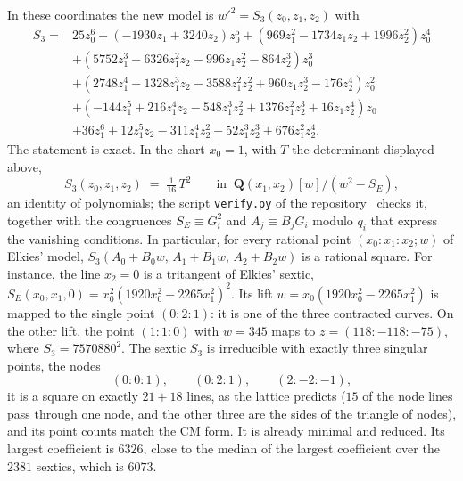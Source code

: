 \documentclass[11pt]{article}
\newcommand{\Q}{\mathbf{Q}}
\theoremstyle{remark}
\begin{document}
In these coordinates the new model is $w'^2=S_{3}(z_0,z_1,z_2)$ with
\begin{align*}
S_{3}={}&25z_0^6+(-1930z_1+3240z_2)z_0^5+(969z_1^2-1734z_1z_2+1996z_2^2)z_0^4\\
&+(5752z_1^3-6326z_1^2z_2-996z_1z_2^2-864z_2^3)z_0^3\\
&+(2748z_1^4-1328z_1^3z_2-3588z_1^2z_2^2+960z_1z_2^3-176z_2^4)z_0^2\\
&+(-144z_1^5+216z_1^4z_2-548z_1^3z_2^2+1376z_1^2z_2^3+16z_1z_2^4)z_0\\
&+36z_1^6+12z_1^5z_2-311z_1^4z_2^2-52z_1^3z_2^3+676z_1^2z_2^4 .
\end{align*}
The statement is exact.  In the chart $x_0=1$, with $T$ the determinant displayed above,
\[
S_3(z_0,z_1,z_2)\;=\;\tfrac1{16}\,T^2\qquad\text{in }\ \Q(x_1,x_2)[w]/(w^2-S_E),
\]
an identity of polynomials; the script \texttt{verify.py} of the repository~\cite{Repo} checks it, together with the congruences
$S_E\equiv G_i^2$ and $A_j\equiv B_jG_i$ modulo $q_i$ that express the vanishing conditions.  In particular, for every rational
point $(x_0:x_1:x_2;w)$ of Elkies' model, $S_3(A_0+B_0w,\,A_1+B_1w,\,A_2+B_2w)$ is a rational square.  For instance, the line $x_2=0$ is a tritangent of Elkies' sextic, $S_E(x_0,x_1,0)=x_0^2(1920x_0^2-2265x_1^2)^2$.
Its lift $w=x_0(1920x_0^2-2265x_1^2)$ is mapped to the single point $(0:2:1)$: it is one of the three contracted curves.
On the other lift, the point $(1:1:0)$ with $w=345$ maps to $z=(118:-118:-75)$, where $S_3=7570880^2$.  The sextic $S_3$ is irreducible with exactly three singular points, the nodes
\[
(0:0:1),\qquad (0:2:1),\qquad (2:-2:-1),
\]
it is a square on exactly $21+18$ lines, as the lattice predicts ($15$ of the node lines pass through one node, and the other
three are the sides of the triangle of nodes), and its point counts match the CM form.  It is already minimal and reduced.  Its largest coefficient is $6326$, close to the median of the largest coefficient
over the $2381$ sextics, which is $6073$.
\end{document}
